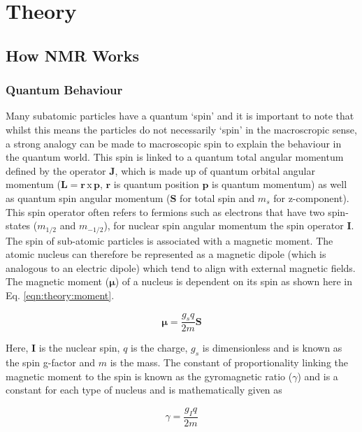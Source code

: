 \chapter{Theory}
\label{Chap:Theory}

\section{How \texorpdfstring{\ac{NMR}}{NMR} Works}
\subsection{Quantum Behaviour}

Many subatomic particles have a quantum `spin' and it is important to note that whilst this means the particles do not necessarily `spin' in the macroscropic sense, a strong analogy can be made to macroscopic spin to explain the behaviour in the quantum world. This spin is linked to a quantum total angular momentum defined by the operator $\mathbf{J}$, which is made up of quantum orbital angular momentum ($\mathbf{L} = \mathbf{r}\, \textrm{x} \, \mathbf{p}$, $\mathbf{r}$ is quantum position $\mathbf{p}$ is quantum momentum) as well as quantum spin angular momentum ($\mathbf{S}$ for total spin and $m_s$ for z-component). This spin operator often refers to fermions such as electrons that have two spin-states ($m_{1/2}$ and $m_{-1/2}$), for nuclear spin angular momentum the spin operator $\mathbf{I}$. The spin of sub-atomic particles is associated with a magnetic moment. The atomic nucleus can therefore be represented as a magnetic dipole (which is analogous to an electric dipole) which tend to align with external magnetic fields. The magnetic moment ($\boldsymbol\mu$) of a nucleus is dependent on its spin as shown here in Eq. \ref{eqn:theory:moment}.

\begin{equation}
    \boldsymbol\mu = \frac{g_sq}{2m} \mathbf{S}
    \label{eqn:theory:moment}
\end{equation}

Here, $\mathbf{I}$ is the nuclear spin, $q$ is the charge, $g_s$ is dimensionless and is known as the spin g-factor and $m$ is the mass. The constant of proportionality linking the magnetic moment to the spin is known as the gyromagnetic ratio ($\gamma$) and is a constant for each type of nucleus and is mathematically given as

\begin{equation}
    \gamma = \frac{g_Iq}{2m}
    \label{eqn:theory:gyro}
\end{equation}

